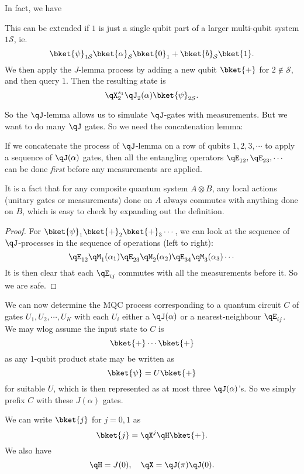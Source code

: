 \documentclass[a4paper]{article}
\begin{document}
In fact, we have
\begin{lemma}
  This can be extended if $1$ is just a single qubit part of a larger multi-qubit system $1\mathcal{S}$, ie.
  \[
    \bket{\psi}_{1\mathcal{S}} \bket{\alpha}_\mathcal{S}\bket{0}_1 + \bket{b}_\mathcal{S} \bket{1}.
  \]
  We then apply the $J$-lemma process  by adding a new qubit $\bket{+}$ for $2 \not \in \mathcal{S}$, and then query $1$. Then the resulting state is
  \[
    \qX_2^{s_1}\qJ_2(\alpha) \bket{\psi}_{2\mathcal{S}}.
  \]
\end{lemma}
So the $\qJ$-lemma allows us to simulate $\qJ$-gates with measurements. But we want to do many $\qJ$ gates. So we need the concatenation lemma:
\begin{lemma}
  If we concatenate the process of $\qJ$-lemma on a row of qubits $1, 2, 3, \cdots$ to apply a sequence of $\qJ(\alpha)$ gates, then all the entangling operators $\qE_{12}, \qE_{23}, \cdots$ can be done \emph{first} before any measurements are applied.
\end{lemma}

It is a fact that for any composite quantum system $A \otimes B$, any local actions (unitary gates or measurements) done on $A$ always commutes with anything done on $B$, which is easy to check by expanding out the definition.

\begin{proof}
  For $\bket{\psi}_1 \bket{+}_2 \bket{+}_3\cdots$, we can look at the sequence of $\qJ$-processes in the sequence of operations (left to right):
  \[
    \qE_{12} \qM_1(\alpha_1) \qE_{23}\qM_2(\alpha_2) \qE_{34} \qM_3(\alpha_3)\cdots
  \]
  It is then clear that each $\qE_{ij}$ commutes with all the measurements before it. So we are safe.
\end{proof}

We can now determine the MQC process corresponding to a quantum circuit $C$ of gates  $U_1, U_2, \cdots, U_K$ with each $U_i$ either a $\qJ(\alpha)$ or a nearest-neighbour $\qE_{ij}$. We may wlog assume the input state to $C$ is
\[
  \bket{+}\cdots\bket{+}
\]
as any $1$-qubit product state may be written as
\[
  \bket{\psi} = U \bket{+}
\]
for suitable $U$, which is then represented as at most three $\qJ(\alpha)$'s. So we simply prefix $C$ with these $J(\alpha)$ gates.

\begin{eg}
  We can write $\bket{j}$ for $j  = 0, 1$ as
  \[
    \bket{j} = \qX^j\qH \bket{+}.
  \]
  We also have
  \[
    \qH = J(0),\quad \qX = \qJ(\pi)\qJ(0).
  \]
\end{eg}
\end{document}
